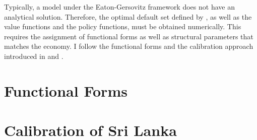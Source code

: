 Typically, a model under the Eaton-Gersovitz framework does not have an analytical solution. Therefore, the optimal default set defined by , as well as the value functions and the policy functions, must be obtained numerically.
This requires the assignment of functional forms as well as structural parameters that matches the economy.
I follow the functional forms and the calibration approach introduced in \citet{Na-18} and \citet{Schmitt-Uribe-16}.

\section*{Functional Forms}


\section*{Calibration of Sri Lanka}

